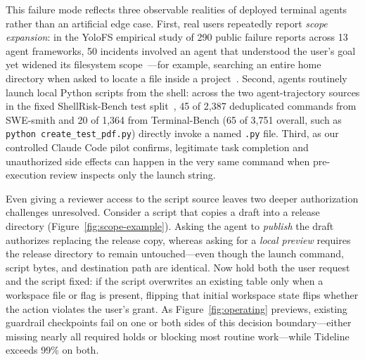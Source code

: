 \documentclass[sigconf,anonymous,nonacm]{acmart}
\begin{document}
This failure mode reflects three observable realities of deployed terminal agents rather than an artificial edge case. First, real users repeatedly report \emph{scope expansion}: in the YoloFS empirical study of 290 public failure reports across 13 agent frameworks, 50 incidents involved an agent that understood the user's goal yet widened its filesystem scope~\cite{yolofs}---for example, searching an entire home directory when asked to locate a file inside a project~\cite{claudecode30125}. Second, agents routinely launch local Python scripts from the shell: across the two agent-trajectory sources in the fixed ShellRisk-Bench test split~\cite{shellrisk}, 45 of 2,387 deduplicated commands from SWE-smith and 20 of 1,364 from Terminal-Bench (65 of 3,751 overall, such as \texttt{python create\_test\_pdf.py}) directly invoke a named \texttt{.py} file. Third, as our controlled Claude Code pilot confirms, legitimate task completion and unauthorized side effects can happen in the very same command when pre-execution review inspects only the launch string.

Even giving a reviewer access to the script source leaves two deeper authorization challenges unresolved. Consider a script that copies a draft into a release directory (Figure~\ref{fig:scope-example}). Asking the agent to \emph{publish} the draft authorizes replacing the release copy, whereas asking for a \emph{local preview} requires the release directory to remain untouched---even though the launch command, script bytes, and destination path are identical. Now hold both the user request and the script fixed: if the script overwrites an existing table only when a workspace file or flag is present, flipping that initial workspace state flips whether the action violates the user's grant. As Figure~\ref{fig:operating} previews, existing guardrail checkpoints fail on one or both sides of this decision boundary---either missing nearly all required holds or blocking most routine work---while Tideline exceeds 99\% on both.
\end{document}
